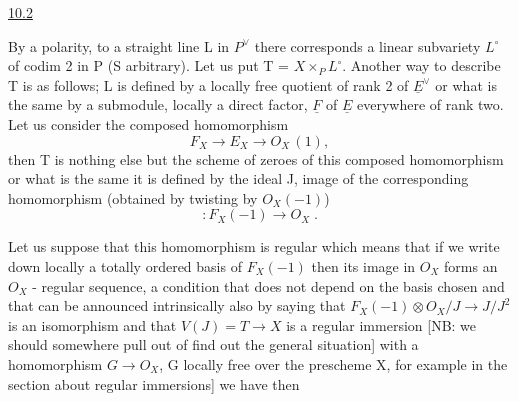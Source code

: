 
\uline{10.2}

By a polarity, to a straight line L in $P^{\vee}$ there corresponds a
linear subvariety $L^{\circ}$ of codim 2 in P (S arbitrary).  Let us put T =
$X \times_{P} L^{\circ}$.  Another way to describe T is as follows; L is defined by
a locally free quotient of rank 2 of $\underline{E}^{\vee}$ or what is the same by a
submodule, locally a direct factor, $\underline{F}$ of $\underline{E}$ everywhere of rank two.
Let us consider the composed homomorphism
\[ F_{X} \to E_{X} \to O_{X}\,(1), \]
then T is nothing else but the scheme of zeroes of this composed
homomorphism or what is the same it is defined by the ideal J,
image of the corresponding homomorphism (obtained by twisting by
$O_{X}(-1)$)
\[ : F_{X}(-1) \to O_{X} \;. \]

Let us suppose that this homomorphism is regular which means
that if we write down locally a totally ordered basis of $F_{X}(-1)$
then its image in $O_{X}$ forms an $O_{X}$ - regular sequence, a condition
that does not depend on the basis chosen and that can be announced
intrinsically also by saying that $F_{X}(-1) \otimes O_{X}/J \to J/J^{2}$ is an
isomorphism and that $V(J) = T \to X$ is a regular immersion [NB: we
should somewhere pull out of find out the general situation] with
a homomorphism $G \to O_{X}$, G locally free over the prescheme X, for
example in the section about regular immersions] we have then
